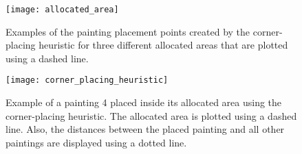 \begin{figure}[h!]
    \texttt{[image: allocated\_area]}
    \caption{Examples of the painting placement points created by the corner-placing heuristic
    for three different allocated areas that are plotted using a dashed line.}
    \label{fig:allocated-area}
\end{figure}

\begin{figure}[h!]
    \texttt{[image: corner\_placing\_heuristic]}
    \caption{Example of a painting 4 placed inside its allocated area using the corner-placing heuristic.
    The allocated area is plotted using a dashed line.
    Also, the distances between the placed painting and all other paintings are displayed using a dotted line.}
    \label{fig:corner-placing-heuristic}
\end{figure}
